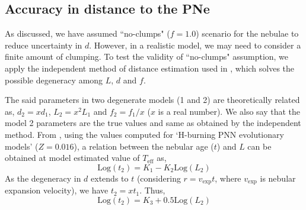 \documentclass[a4paper,fleqn,usenatbib]{mnras}
\begin{document}
\subsection{Accuracy in distance to the PNe} \label{sec:distance}
As discussed, we have assumed ``no-clumps" ($f=1.0$) scenario for the nebulae to reduce uncertainty in $d$. However, in a realistic model, we may need to consider a finite amount of clumping. To test the validity of ``no-clumps" assumption, we apply the independent method of distance estimation used in \citet{2009A&A...507.1517M}, which solves the possible degeneracy among $L$, $d$ and $f$. 

The said parameters in two degenerate models (1 and 2) are theoretically related as, ${d_2}=x{d_1}$, ${L_2}=x^2{L_1}$ and ${f_2}={f_1}/x$ ($x$ is a real number). We also say that the model 2 parameters are the true values and same as obtained by the independent method. From \citet{1994ApJS...92..125V}, using the values computed for `H-burning PNN evolutionary models' ($Z=0.016$), a relation between the nebular age ($t$) and $L$ can be obtained at model estimated value of $T_\mathrm{eff}$ as,  
\begin{equation}
\mathrm{Log}(t_2)=K_1-K_2\mathrm{Log}(L_2)
\end{equation}
As the degeneracy in $d$ extends to $t$ (considering $r={v_\mathrm{exp}}t$, where $v_\mathrm{exp}$ is nebular expansion velocity), we have ${t_2}=x{t_1}$. Thus, 
\begin{equation}
\mathrm{Log}(t_2)=K_3+0.5\mathrm{Log}(L_2) 
\end{equation}
\end{document}
